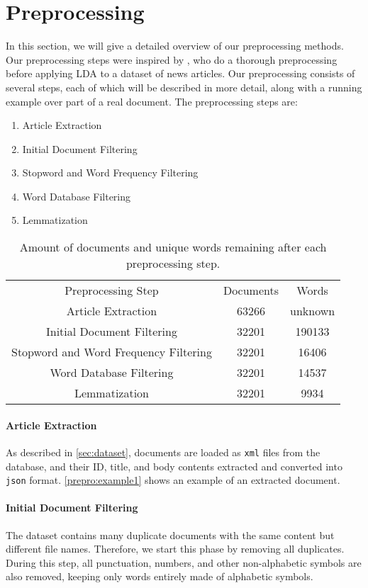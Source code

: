 \section{Preprocessing}\label{sec:prepro}

In this section, we will give a detailed overview of our preprocessing methods.
Our preprocessing steps were inspired by \cite{quanti}, who do a thorough preprocessing before applying LDA to a dataset of news articles. 
Our preprocessing consists of several steps, each of which will be described in more detail, along with a running example over part of a real document.
The preprocessing steps are:
\begin{enumerate}[label=\alph*]
	\item Article Extraction
	\item Initial Document Filtering
	\item Stopword and Word Frequency Filtering
	\item Word Database Filtering
	\item Lemmatization 
\end{enumerate}

\begin{table}
	\begin{tabular}{c|c|c}
		Preprocessing Step & Documents & Words\\
		Article Extraction & 63266 & unknown \\ 
		Initial Document Filtering & 32201 & 190133 \\ 
		Stopword and Word Frequency Filtering & 32201 & 16406 \\
		Word Database Filtering & 32201 & 14537 \\
		Lemmatization & 32201 & 9934\\
	\end{tabular}
	\label{tab:prepro_doc_word}
	\caption{Amount of documents and unique words remaining after each preprocessing step.}
\end{table}

\paragraph{Article Extraction}
As described in \autoref{sec:dataset}, documents are loaded as \texttt{xml} files from the database, and their ID, title, and body contents extracted and converted into \texttt{json} format.
\autoref{prepro:example1} shows an example of an extracted document.

\paragraph{Initial Document Filtering}
The dataset contains many duplicate documents with the same content but different file names.
Therefore, we start this phase by removing all duplicates.
During this step, all punctuation, numbers, and other non-alphabetic symbols are also removed, keeping only words entirely made of alphabetic symbols.

